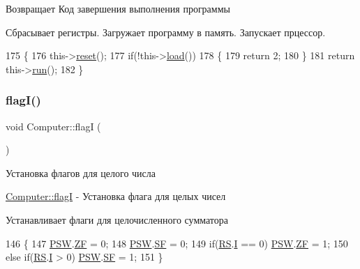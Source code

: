 \begin{DoxyReturn}{Возвращает}
Код завершения выполнения программы
\end{DoxyReturn}
Сбрасывает регистры. Загружает программу в память. Запускает прцессор. 
\begin{DoxyCode}
175 \{
176     this->\hyperlink{class_computer_aeab90cbacbef385685717c249a07929d}{reset}();
177     \textcolor{keywordflow}{if}(!this->\hyperlink{class_computer_adeb4bbeee2b9c13616dc8c4ef52cbe60}{load}())
178     \{
179         \textcolor{keywordflow}{return} 2;
180     \}
181     \textcolor{keywordflow}{return} this->\hyperlink{class_computer_af337e329e3bc6d80bbd7070e25ce5731}{run}();
182 \}
\end{DoxyCode}
\hypertarget{class_computer_aae4a76a8a03a6c9fb1c12968d629be3e}{}\label{class_computer_aae4a76a8a03a6c9fb1c12968d629be3e} 
\subsubsection{\texorpdfstring{flag\+I()}{flagI()}}
{\footnotesize\ttfamily void Computer\+::flagI (\begin{DoxyParamCaption}{ }\end{DoxyParamCaption})\hspace{0.3cm}{\ttfamily [private]}}



Установка флагов для целого числа 

\hyperlink{class_computer_aae4a76a8a03a6c9fb1c12968d629be3e}{Computer\+::flagI} -\/ Установка флага для целых чисел

Устанавливает флаги для целочисленного сумматора 
\begin{DoxyCode}
146 \{
147     \hyperlink{class_computer_aada011a29d87bb979835371a5f09805e}{PSW}.\hyperlink{struct_computer_1_1bits_a5307edeadd212f1fc19e9f6f5346df39}{ZF} = 0;
148     \hyperlink{class_computer_aada011a29d87bb979835371a5f09805e}{PSW}.\hyperlink{struct_computer_1_1bits_a74cfe87f17ba348db37c74bbd5e56828}{SF} = 0;
149     \textcolor{keywordflow}{if}(\hyperlink{class_computer_a874503110664b3cf821118d2ce9c2b96}{RS}.\hyperlink{union_computer_1_1data_a6e51de6e0351adc4e50b336a092bc4bb}{I} == 0) \hyperlink{class_computer_aada011a29d87bb979835371a5f09805e}{PSW}.\hyperlink{struct_computer_1_1bits_a5307edeadd212f1fc19e9f6f5346df39}{ZF} = 1;
150     \textcolor{keywordflow}{else} \textcolor{keywordflow}{if}(\hyperlink{class_computer_a874503110664b3cf821118d2ce9c2b96}{RS}.\hyperlink{union_computer_1_1data_a6e51de6e0351adc4e50b336a092bc4bb}{I} > 0) \hyperlink{class_computer_aada011a29d87bb979835371a5f09805e}{PSW}.\hyperlink{struct_computer_1_1bits_a74cfe87f17ba348db37c74bbd5e56828}{SF} = 1;
151 \}
\end{DoxyCode}
\hypertarget{class_computer_aae860bb217270ec88e8ebf6fe2c2adc9}{}\label{class_computer_aae860bb217270ec88e8ebf6fe2c2adc9} 
